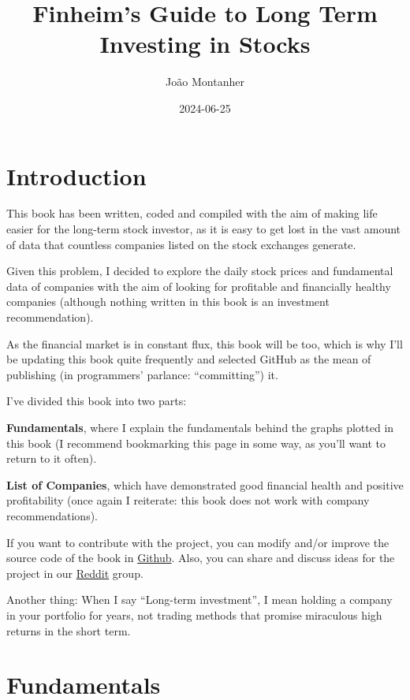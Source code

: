 \documentclass[
]{book}
\title{Finheim's Guide to Long Term Investing in Stocks}
\author{João Montanher}
\date{2024-06-25}
\begin{document}
\maketitle

{
\setcounter{tocdepth}{1}
\tableofcontents
}
\hypertarget{introduction}{%
\chapter{Introduction}\label{introduction}}

This book has been written, coded and compiled with the aim of making life easier for the long-term stock investor, as it is easy to get lost in the vast amount of data that countless companies listed on the stock exchanges generate.

Given this problem, I decided to explore the daily stock prices and fundamental data of companies with the aim of looking for profitable and financially healthy companies (although nothing written in this book is an investment recommendation).

As the financial market is in constant flux, this book will be too, which is why I'll be updating this book quite frequently and selected GitHub as the mean of publishing (in programmers' parlance: ``committing'') it.

I've divided this book into two parts:

\textbf{Fundamentals}, where I explain the fundamentals behind the graphs plotted in this book (I recommend bookmarking this page in some way, as you'll want to return to it often).

\textbf{List of Companies}, which have demonstrated good financial health and positive profitability (once again I reiterate: this book does not work with company recommendations).

If you want to contribute with the project, you can modify and/or improve the source code of the book in \href{https://github.com/JoaoMontanher/Finheim-Main-Book}{Github}. Also, you can share and discuss ideas for the project in our \href{https://www.reddit.com/r/Finheim/}{Reddit} group.

Another thing: When I say ``Long-term investment'', I mean holding a company in your portfolio for years, not trading methods that promise miraculous high returns in the short term.

\hypertarget{fundamentals}{%
\chapter{Fundamentals}\label{fundamentals}}
\end{document}
